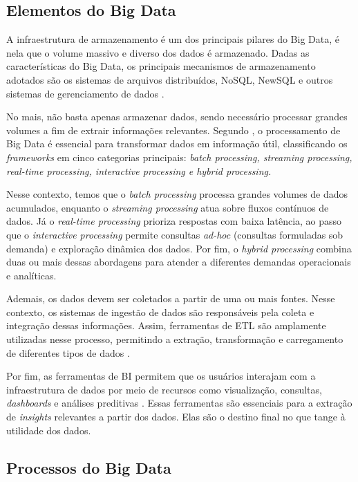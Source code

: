 \subsection{Elementos do Big Data}
\label{sec:elementos-big-data}

A infraestrutura de armazenamento é um dos principais pilares do Big Data, é nela que o 
volume massivo e diverso dos dados é armazenado. Dadas as características do Big Data, os 
principais mecanismos de armazenamento adotados são os sistemas de arquivos distribuídos, 
NoSQL, NewSQL e outros sistemas de gerenciamento de dados \cite{wang2020architecture}. 

No mais, não basta apenas armazenar dados, sendo necessário processar grandes volumes a 
fim de extrair informações relevantes. Segundo , o processamento de Big Data 
é essencial para transformar dados em informação útil, classificando os \textit{frameworks} em cinco 
categorias principais: \textit{batch processing, streaming processing, real-time processing, 
interactive processing e hybrid processing.}

Nesse contexto, temos que o \textit{batch processing} processa grandes volumes de dados acumulados, 
enquanto o \textit{streaming processing} atua sobre fluxos contínuos de dados. 
Já o \textit{real-time processing} prioriza respostas com baixa latência, ao passo que o 
\textit{interactive processing} permite consultas \textit{ad-hoc} (consultas formuladas sob demanda) 
e exploração dinâmica dos dados. Por fim, o \textit{hybrid processing} combina duas ou mais dessas 
abordagens para atender a diferentes demandas operacionais e analíticas.

Ademais, os dados devem ser coletados a partir de uma ou mais fontes. Nesse contexto, os 
sistemas de ingestão de dados são responsáveis pela coleta e integração dessas informações. 
Assim, ferramentas de ETL são amplamente utilizadas nesse processo, permitindo a extração, 
transformação e carregamento de diferentes tipos de dados \cite{wang2020architecture}.

Por fim, as ferramentas de BI permitem que os usuários interajam com 
a infraestrutura de dados por meio de recursos como visualização, consultas, \textit{dashboards} 
e análises preditivas \cite{sherman2015business}. Essas ferramentas são essenciais para a extração 
de \textit{insights} relevantes a partir dos dados. Elas são o destino final no que tange à
utilidade dos dados.

\subsection{Processos do Big Data}

